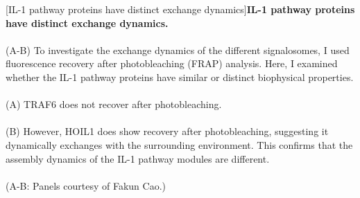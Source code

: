 \begin{centering}

\captionsetup{parbox=none}
[IL-1 pathway proteins have distinct exchange dynamics]{\textbf{IL-1 pathway proteins have distinct exchange dynamics.}
\\
\\
(A-B) To investigate the exchange dynamics of the different signalosomes, I used fluorescence recovery after photobleaching (FRAP) analysis. Here, I examined whether the IL-1 pathway proteins have similar or distinct biophysical properties.
\\
\\
(A) TRAF6 does not recover after photobleaching.
\\
\\
(B) However, HOIL1 does show recovery after photobleaching,  suggesting it dynamically exchanges with the surrounding environment. This confirms that the assembly dynamics of the IL-1 pathway modules are different.
\\
\\
(A-B: Panels courtesy of Fakun Cao.)}
\label{p2:2}
\end{centering}

